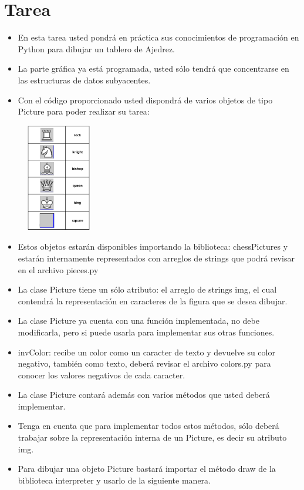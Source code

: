\documentclass{article}
\begin{document}
	\section{Tarea}
	\begin{itemize}		
		\item En esta tarea usted pondrá en práctica sus conocimientos de programación en Python para dibujar un tablero de Ajedrez.
		\item La parte gráfica ya está programada, usted sólo tendrá que concentrarse en las estructuras de datos subyacentes.
		\item Con el código proporcionado usted dispondrá de varios objetos de tipo Picture para poder realizar su tarea:
	\end{itemize}
        \begin{figure}[H]
		\centering
		\includegraphics[width=0.25\textwidth,keepaspectratio]{img/picture.png}
	\end{figure}
 	\begin{itemize}		
            \item Estos objetos estarán disponibles importando la biblioteca: chessPictures y estarán internamente representados con arreglos de strings que podrá revisar en el archivo pieces.py
            \item La clase Picture tiene un sólo atributo: el arreglo de strings img, el cual contendrá la representación en caracteres de la figura que se desea dibujar.
            \item La clase Picture ya cuenta con una función implementada, no debe modificarla, pero si puede usarla para implementar sus otras funciones.
            \item invColor: recibe un color como un caracter de texto y devuelve su color negativo, también como texto, deberá revisar el archivo colors.py para conocer los valores negativos de cada caracter.
            \item La clase Picture contará además con varios métodos que usted deberá implementar.
            \item Tenga en cuenta que para implementar todos estos métodos, sólo deberá trabajar sobre la representación interna de un Picture, es decir su atributo img.
            \item Para dibujar una objeto Picture bastará importar el método draw de la biblioteca interpreter y usarlo de la siguiente manera.
        \end{itemize}
\end{document}
